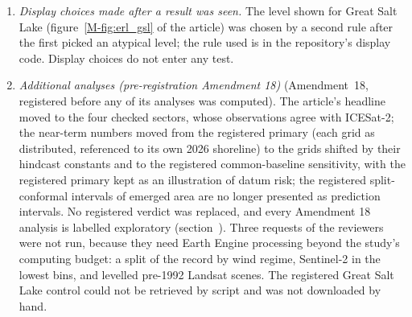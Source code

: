 \begin{enumerate}
\item \emph{Display choices made after a result was seen.} The level shown for Great Salt Lake (figure~\ref{M-fig:erl_gsl} of the article) was chosen by a second rule after the first picked an atypical level; the rule used is in the repository's display code. Display choices do not enter any test.
\item \emph{Additional analyses (pre-registration Amendment 18)} (Amendment~18, registered before any of its analyses was computed). The article's headline moved to the four checked sectors, whose observations agree with ICESat-2; the near-term numbers moved from the registered primary (each grid as distributed, referenced to its own 2026 shoreline) to the grids shifted by their hindcast constants and to the registered common-baseline sensitivity, with the registered primary kept as an illustration of datum risk; the registered split-conformal intervals of emerged area are no longer presented as prediction intervals. No registered verdict was replaced, and every Amendment 18 analysis is labelled exploratory (section~\SIrevision). Three requests of the reviewers were not run, because they need Earth Engine processing beyond the study's computing budget: a split of the record by wind regime, Sentinel-2 in the lowest bins, and levelled pre-1992 Landsat scenes. The registered Great Salt Lake control could not be retrieved by script and was not downloaded by hand.

\end{enumerate}
